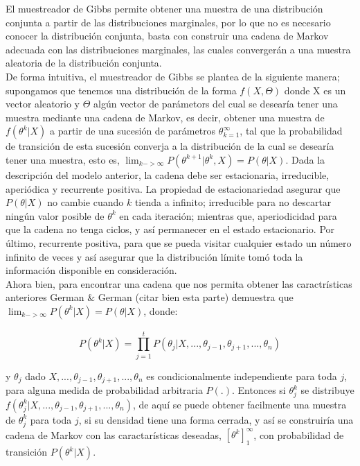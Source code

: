 El muestreador de Gibbs permite obtener una muestra de una distribución conjunta a partir de las distribuciones marginales, por lo que no es necesario conocer la distribución conjunta, basta con construir una cadena de Markov adecuada  con las distribuciones marginales, las cuales convergerán a una muestra aleatoria de la distribución conjunta.\\

De forma intuitiva, el muestreador de Gibbs se plantea de la siguiente manera; supongamos que tenemos una distribución de la forma $f(X,\Theta)$ donde X es un vector aleatorio y $\Theta$ algún vector de parámetors del cual se desearía tener una muestra mediante una cadena de Markov, es decir, obtener una muestra de $f(\theta ^{k}|X)$ a partir de una sucesión de parámetros ${\theta}_{k=1} ^{\infty}$, tal que la probabilidad de transición de esta sucesión converja a la distribución de la cual se desearía tener una muestra, esto es, $\lim_{k->\infty} P(\theta^{k+1}|\theta^{k},X)=P(\theta|X)$. Dada la descripción del modelo anterior, la cadena debe ser estacionaria, irreducible, aperiódica y recurrente positiva. La propiedad de estacionariedad asegurar que $P(\theta|X)$ no cambie cuando $k$ tienda a infinito; irreducible para no descartar ningún valor posible de $\theta ^{k}$ en cada iteración; mientras que, aperiodicidad para que la cadena no tenga ciclos, y así permanecer en el estado estacionario. Por último, recurrente positiva, para que se pueda visitar cualquier estado un número infinito de veces y así asegurar que la distribución límite tomó toda la información disponible en consideración.\\

Ahora bien, para encontrar una cadena que nos permita obtener las caractrísticas anteriores German $\&$ German (citar bien esta parte) demuestra que  $ \lim_{k->\infty} P(\theta^{k}|X)=P(\theta|X)$, donde:
 
 \begin{equation*}
 P(\theta^{k}|X)=\stackrel{~}{{\prod}_{j=1}^{t }}P(\theta_{j}|X,...,\theta_{j-1},\theta_{j+1},...,\theta_{n}) 
 \end{equation*}

 y $\theta_{j}$ dado $X,...,\theta_{j-1},\theta_{j+1},...,\theta_{n}$ es condicionalmente independiente para toda $j$, para alguna medida de probabilidad arbitraria $P(.)$. Entonces si $\theta_{j} ^{k}$ se distribuye $ f(\theta_{j} ^{k}|X,...,\theta_{j-1},\theta_{j+1},...,\theta_{n})$, de aquí se puede obtener facilmente una muestra de $\theta_{j} ^{k}$ para toda $j$, si su densidad tiene una forma cerrada, y así se construiría una cadena de Markov con las caractarísticas deseadas, $[\theta^{k}] _{1} ^{\infty}$, con probabilidad de transición $P(\theta^{k}|X)$.\\

